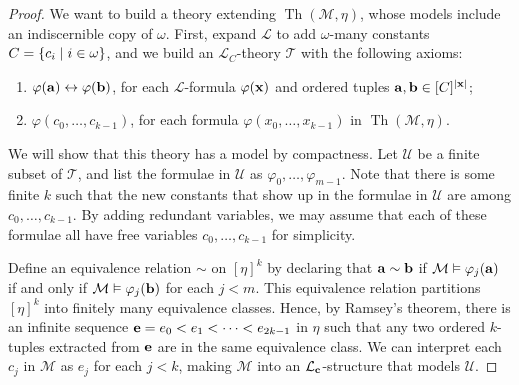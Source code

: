 \begin{proof}
	We want to build a theory extending \( \operatorname{Th}(\mathcal M, \eta) \), whose models include an indiscernible copy of \( \omega \).
	First, expand \( \mathcal L \) to add \( \omega \)-many constants \( C = \qty{c_i \mid i \in \omega} \), and we build an \( \mathcal L_C \)-theory \( \mathcal T \) with the following axioms:
	\begin{enumerate}
		\item \( \varphi(\vb a) \leftrightarrow \varphi(\vb b) \), for each \( \mathcal L \)-formula \( \varphi(\vb x) \) and ordered tuples \( \vb a, \vb b \in [C]^{\abs{\vb x}} \);
		\item \( \varphi(c_0, \dots, c_{k-1}) \), for each formula \( \varphi(x_0, \dots, x_{k-1}) \) in \( \operatorname{Th}(\mathcal M, \eta) \).
	\end{enumerate}
	We will show that this theory has a model by compactness.
	Let \( \mathcal U \) be a finite subset of \( \mathcal T \), and list the formulae in \( \mathcal U \) as \( \varphi_0, \dots, \varphi_{m-1} \).
	Note that there is some finite \( k \) such that the new constants that show up in the formulae in \( \mathcal U \) are among \( c_0, \dots, c_{k-1} \).
	By adding redundant variables, we may assume that each of these formulae all have free variables \( c_0, \dots, c_{k-1} \) for simplicity.

	Define an equivalence relation \( \sim \) on \( [\eta]^k \) by declaring that \( \vb a \sim \vb b \) if \( \mathcal M \vDash \varphi_j(\vb a) \) if and only if \( \mathcal M \vDash \varphi_j(\vb b) \) for each \( j < m \).
	This equivalence relation partitions \( [\eta]^k \) into finitely many equivalence classes.
	Hence, by Ramsey's theorem, there is an infinite sequence \( \vb e = e_0 < e_1 < \dots < e_{2k-1} \) in \( \eta \) such that any two ordered \( k \)-tuples extracted from \( \vb e \) are in the same equivalence class.
	We can interpret each \( c_j \) in \( \mathcal M \) as \( e_j \) for each \( j < k \), making \( \mathcal M \) into an \( \mathcal L_{\vb c} \)-structure that models \( \mathcal U \).


\end{proof}
